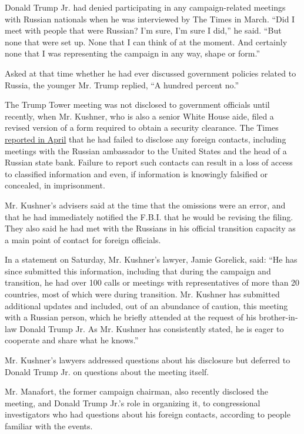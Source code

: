 Donald Trump Jr. had denied participating in any campaign-related
meetings with Russian nationals when he was interviewed by The Times in
March. ``Did I meet with people that were Russian? I'm sure, I'm sure I
did,'' he said. ``But none that were set up. None that I can think of at
the moment. And certainly none that I was representing the campaign in
any way, shape or form.''

Asked at that time whether he had ever discussed government policies
related to Russia, the younger Mr. Trump replied, ``A hundred percent
no.''

The Trump Tower meeting was not disclosed to government officials until
recently, when Mr. Kushner, who is also a senior White House aide, filed
a revised version of a form required to obtain a security clearance. The
Times
\href{https://www.nytimes3xbfgragh.onion/2017/04/06/us/politics/jared-kushner-russians-security-clearance.html}{reported
in April} that he had failed to disclose any foreign contacts, including
meetings with the Russian ambassador to the United States and the head
of a Russian state bank. Failure to report such contacts can result in a
loss of access to classified information and even, if information is
knowingly falsified or concealed, in imprisonment.

Mr. Kushner's advisers said at the time that the omissions were an
error, and that he had immediately notified the F.B.I. that he would be
revising the filing. They also said he had met with the Russians in his
official transition capacity as a main point of contact for foreign
officials.

In a statement on Saturday, Mr. Kushner's lawyer, Jamie Gorelick, said:
``He has since submitted this information, including that during the
campaign and transition, he had over 100 calls or meetings with
representatives of more than 20 countries, most of which were during
transition. Mr. Kushner has submitted additional updates and included,
out of an abundance of caution, this meeting with a Russian person,
which he briefly attended at the request of his brother-in-law Donald
Trump Jr. As Mr. Kushner has consistently stated, he is eager to
cooperate and share what he knows.''

Mr. Kushner's lawyers addressed questions about his disclosure but
deferred to Donald Trump Jr. on questions about the meeting itself.

Mr. Manafort, the former campaign chairman, also recently disclosed the
meeting, and Donald Trump Jr.'s role in organizing it, to congressional
investigators who had questions about his foreign contacts, according to
people familiar with the events.

